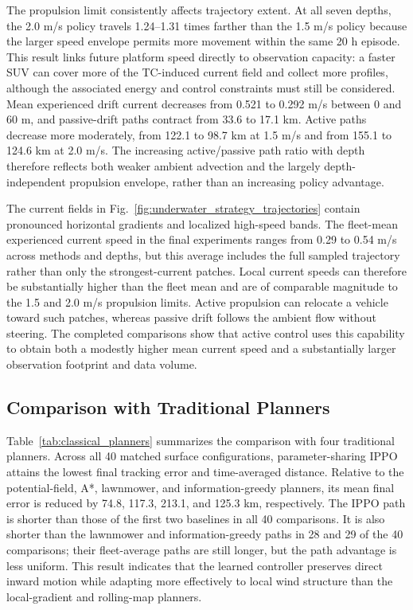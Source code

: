 \documentclass[a4paper,fleqn]{cas-dc}
\begin{document}
The propulsion limit consistently affects trajectory extent. At all seven
depths, the 2.0 m/s policy travels 1.24--1.31 times farther than the 1.5 m/s
policy because the larger speed envelope permits more movement within the same
20 h episode. This result links future platform speed directly to observation
capacity: a faster SUV can cover more of the TC-induced current field and
collect more profiles, although the associated energy and control constraints
must still be considered. Mean experienced drift current decreases from 0.521
to 0.292 m/s between 0 and 60 m, and passive-drift paths contract from 33.6 to
17.1 km. Active paths decrease more moderately, from 122.1 to 98.7 km at
1.5 m/s and from 155.1 to 124.6 km at 2.0 m/s. The increasing active/passive
path ratio with depth therefore reflects both weaker ambient advection and the
largely depth-independent propulsion envelope, rather than an increasing
policy advantage.

The current fields in Fig.~\ref{fig:underwater_strategy_trajectories} contain
pronounced horizontal gradients and localized high-speed bands. The
fleet-mean experienced current speed in the final experiments ranges from
0.29 to 0.54 m/s across methods and depths, but this average includes the full
sampled trajectory rather than only the strongest-current patches. Local
current speeds can therefore be substantially higher than the fleet mean and
are of comparable magnitude to the 1.5 and 2.0 m/s propulsion limits. Active
propulsion can relocate a vehicle toward such patches, whereas passive drift
follows the ambient flow without steering. The completed comparisons show that
active control uses this capability to obtain both a modestly higher mean
current speed and a substantially larger observation footprint and data
volume.

\subsection{Comparison with Traditional Planners}
\label{subsec:classical_results}

Table~\ref{tab:classical_planners} summarizes the comparison with four
traditional planners. Across all 40 matched surface configurations,
parameter-sharing IPPO attains the lowest final tracking error and
time-averaged distance. Relative to the potential-field, A*, lawnmower, and
information-greedy planners, its mean final error is reduced by 74.8, 117.3,
213.1, and 125.3 km, respectively. The IPPO path is shorter than those of the
first two baselines in all 40 comparisons. It is also shorter than the
lawnmower and information-greedy paths in 28 and 29 of the 40 comparisons;
their fleet-average paths are still longer, but the path advantage is less
uniform. This result indicates that the learned controller preserves direct
inward motion while adapting more effectively to local wind structure than
the local-gradient and rolling-map planners.
\end{document}
